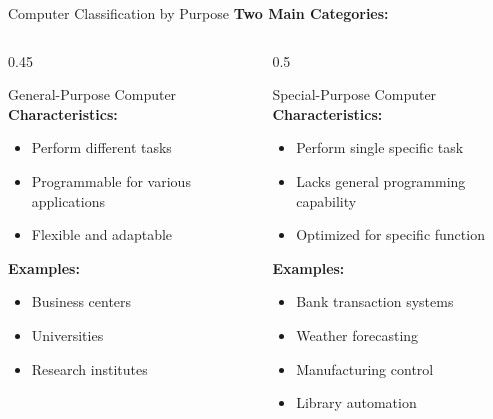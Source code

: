 \documentclass[aspectratio=169]{beamer}
\begin{document}
\begin{frame}{Computer Classification by Purpose}
    \textbf{Two Main Categories:}
    
    \begin{columns}
        \begin{column}{0.45\textwidth}
            \begin{block}{General-Purpose Computer}
                \textbf{Characteristics:}
                \begin{itemize}
                    \item Perform different tasks
                    \item Programmable for various applications
                    \item Flexible and adaptable
                \end{itemize}
                
                \textbf{Examples:}
                \begin{itemize}
                    \item Business centers
                    \item Universities
                    \item Research institutes
                \end{itemize}
            \end{block}
        \end{column}
        \begin{column}{0.5\textwidth}
            \begin{block}{Special-Purpose Computer}
                \textbf{Characteristics:}
                \begin{itemize}
                    \item Perform single specific task
                    \item Lacks general programming capability
                    \item Optimized for specific function
                \end{itemize}
                
                \textbf{Examples:}
                \begin{itemize}
                    \item Bank transaction systems
                    \item Weather forecasting
                    \item Manufacturing control
                    \item Library automation
                \end{itemize}
            \end{block}
        \end{column}
    \end{columns}
\end{frame}
\end{document}
